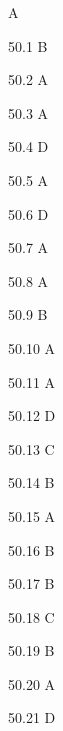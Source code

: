 \begin{Solution}{50}
A
\end{Solution}
\begin{Solution}{50.{1}}
B
\end{Solution}
\begin{Solution}{50.{2}}
A
\end{Solution}
\begin{Solution}{50.{3}}
A
\end{Solution}
\begin{Solution}{50.{4}}
D
\end{Solution}
\begin{Solution}{50.{5}}
A
\end{Solution}
\begin{Solution}{50.{6}}
D
\end{Solution}
\begin{Solution}{50.{7}}
A
\end{Solution}
\begin{Solution}{50.{8}}
A
\end{Solution}
\begin{Solution}{50.{9}}
B
\end{Solution}
\begin{Solution}{50.{10}}
A
\end{Solution}
\begin{Solution}{50.{11}}
A
\end{Solution}
\begin{Solution}{50.{12}}
D
\end{Solution}
\begin{Solution}{50.{13}}
C
\end{Solution}
\begin{Solution}{50.{14}}
B
\end{Solution}
\begin{Solution}{50.{15}}
A
\end{Solution}
\begin{Solution}{50.{16}}
B
\end{Solution}
\begin{Solution}{50.{17}}
B
\end{Solution}
\begin{Solution}{50.{18}}
C
\end{Solution}
\begin{Solution}{50.{19}}
B
\end{Solution}
\begin{Solution}{50.{20}}
A
\end{Solution}
\begin{Solution}{50.{21}}
D
\end{Solution}
